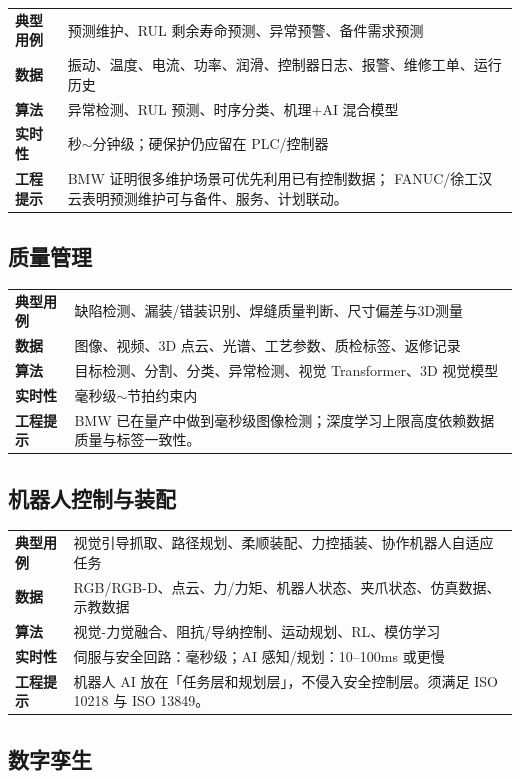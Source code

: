 \documentclass[a4paper,12pt]{ctexart}
\begin{document}
\begin{tabular}{@{}>{\bfseries}lp{11cm}@{}}
典型用例 & 预测维护、RUL 剩余寿命预测、异常预警、备件需求预测 \\
数据 & 振动、温度、电流、功率、润滑、控制器日志、报警、维修工单、运行历史 \\
算法 & 异常检测、RUL 预测、时序分类、机理+AI 混合模型 \\
实时性 & 秒$\sim$分钟级；硬保护仍应留在 PLC/控制器 \\
工程提示 & BMW 证明很多维护场景可优先利用已有控制数据；
FANUC/徐工汉云表明预测维护可与备件、服务、计划联动。
\end{tabular}

\subsection{质量管理}

\begin{tabular}{@{}>{\bfseries}lp{11cm}@{}}
典型用例 & 缺陷检测、漏装/错装识别、焊缝质量判断、尺寸偏差与3D测量 \\
数据 & 图像、视频、3D 点云、光谱、工艺参数、质检标签、返修记录 \\
算法 & 目标检测、分割、分类、异常检测、视觉 Transformer、3D 视觉模型 \\
实时性 & 毫秒级$\sim$节拍约束内 \\
工程提示 & BMW 已在量产中做到毫秒级图像检测；深度学习上限高度依赖数据质量与标签一致性。
\end{tabular}

\subsection{机器人控制与装配}

\begin{tabular}{@{}>{\bfseries}lp{11cm}@{}}
典型用例 & 视觉引导抓取、路径规划、柔顺装配、力控插装、协作机器人自适应任务 \\
数据 & RGB/RGB-D、点云、力/力矩、机器人状态、夹爪状态、仿真数据、示教数据 \\
算法 & 视觉-力觉融合、阻抗/导纳控制、运动规划、RL、模仿学习 \\
实时性 & 伺服与安全回路：毫秒级；AI 感知/规划：10--100ms 或更慢 \\
工程提示 & 机器人 AI 放在「任务层和规划层」，不侵入安全控制层。须满足 ISO 10218 与 ISO 13849。
\end{tabular}

\subsection{数字孪生}
\end{document}
